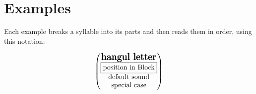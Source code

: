 \section{Examples}
    Each example breaks a syllable into its parts and then reads them in order, using this notation:

    \begin{equation}
        \begin{pmatrix} \pmb{\text{\Large hangul letter}} \\ \boxed{\text{position in Block}} \\ \text{default sound} \\ \text{special case}\end{pmatrix}
    \end{equation}

    
    
    
    
    

    
    
    